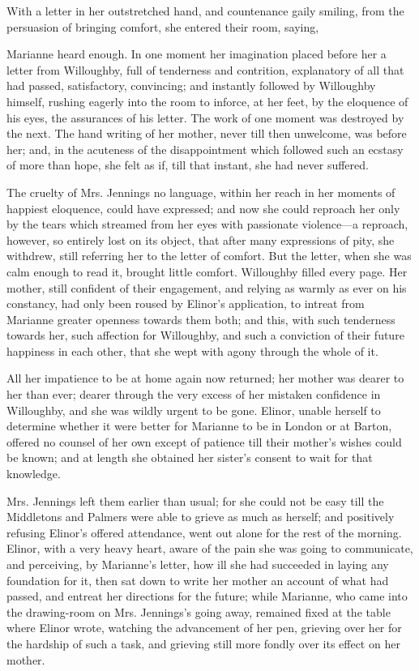 With a letter in her outstretched hand, and countenance gaily smiling, from the persuasion of bringing comfort, she entered their room, saying,


Marianne heard enough. In one moment her imagination placed before her a letter from Willoughby, full of tenderness and contrition, explanatory of all that had passed, satisfactory, convincing; and instantly followed by Willoughby himself, rushing eagerly into the room to inforce, at her feet, by the eloquence of his eyes, the assurances of his letter. The work of one moment was destroyed by the next. The hand writing of her mother, never till then unwelcome, was before her; and, in the acuteness of the disappointment which followed such an ecstasy of more than hope, she felt as if, till that instant, she had never suffered.

The cruelty of Mrs. Jennings no language, within her reach in her moments of happiest eloquence, could have expressed; and now she could reproach her only by the tears which streamed from her eyes with passionate violence---a reproach, however, so entirely lost on its object, that after many expressions of pity, she withdrew, still referring her to the letter of comfort. But the letter, when she was calm enough to read it, brought little comfort. Willoughby filled every page. Her mother, still confident of their engagement, and relying as warmly as ever on his constancy, had only been roused by Elinor's application, to intreat from Marianne greater openness towards them both; and this, with such tenderness towards her, such affection for Willoughby, and such a conviction of their future happiness in each other, that she wept with agony through the whole of it.

All her impatience to be at home again now returned; her mother was dearer to her than ever; dearer through the very excess of her mistaken confidence in Willoughby, and she was wildly urgent to be gone. Elinor, unable herself to determine whether it were better for Marianne to be in London or at Barton, offered no counsel of her own except of patience till their mother's wishes could be known; and at length she obtained her sister's consent to wait for that knowledge.

Mrs. Jennings left them earlier than usual; for she could not be easy till the Middletons and Palmers were able to grieve as much as herself; and positively refusing Elinor's offered attendance, went out alone for the rest of the morning. Elinor, with a very heavy heart, aware of the pain she was going to communicate, and perceiving, by Marianne's letter, how ill she had succeeded in laying any foundation for it, then sat down to write her mother an account of what had passed, and entreat her directions for the future; while Marianne, who came into the drawing-room on Mrs. Jennings's going away, remained fixed at the table where Elinor wrote, watching the advancement of her pen, grieving over her for the hardship of such a task, and grieving still more fondly over its effect on her mother.

